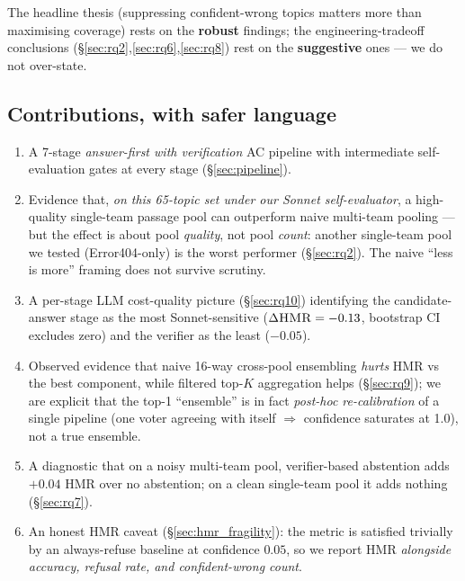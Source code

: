 \documentclass[11pt,a4paper]{article}
\newcommand{\HMR}{\textsc{HMR}}
\begin{document}
\noindent The headline thesis (suppressing confident-wrong topics
matters more than maximising coverage) rests on the \textbf{robust}
findings; the engineering-tradeoff conclusions
(\S\ref{sec:rq2},\ref{sec:rq6},\ref{sec:rq8}) rest on the
\textbf{suggestive} ones --- we do not over-state.

\subsection{Contributions, with safer language}

\begin{enumerate}[leftmargin=*]
  \item A 7-stage \emph{answer-first with verification} AC pipeline with
    intermediate self-evaluation gates at every stage (\S\ref{sec:pipeline}).
  \item Evidence that, \emph{on this 65-topic set under our Sonnet
    self-evaluator}, a high-quality single-team passage pool can
    outperform naive multi-team pooling — but the effect is about
    pool \emph{quality}, not pool \emph{count}: another single-team
    pool we tested (Error404-only) is the worst performer
    (\S\ref{sec:rq2}). The naive ``less is more'' framing does not
    survive scrutiny.
  \item A per-stage LLM cost-quality picture (\S\ref{sec:rq10})
    identifying the candidate-answer stage as the most
    Sonnet-sensitive ($\Delta\HMR=-0.13$, bootstrap CI excludes zero)
    and the verifier as the least ($-0.05$).
  \item Observed evidence that naive 16-way cross-pool ensembling
    \emph{hurts} HMR vs the best component, while filtered top-$K$
    aggregation helps (\S\ref{sec:rq9}); we are explicit that the
    top-1 ``ensemble'' is in fact \emph{post-hoc re-calibration} of a
    single pipeline (one voter agreeing with itself $\Rightarrow$
    confidence saturates at 1.0), not a true ensemble.
  \item A diagnostic that on a noisy multi-team pool, verifier-based
    abstention adds $+0.04$ HMR over no abstention; on a clean
    single-team pool it adds nothing (\S\ref{sec:rq7}).
  \item An honest \HMR{} caveat (\S\ref{sec:hmr_fragility}): the metric
    is satisfied trivially by an always-refuse baseline at confidence
    $0.05$, so we report HMR \emph{alongside accuracy, refusal rate,
    and confident-wrong count}.
\end{enumerate}
\end{document}
